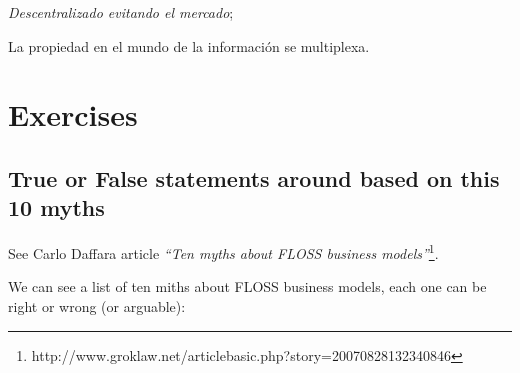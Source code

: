 \documentclass[11pt]{scrartcl}
\begin{document}
\emph{Descentralizado evitando el mercado};

La propiedad en el mundo de la información se multiplexa.

\section{Exercises}

\subsection{True or False statements around  based on this 10 myths}

See Carlo Daffara article \emph{“Ten myths about FLOSS business models”}\footnote{http://www.groklaw.net/articlebasic.php?story=20070828132340846}.

We can see a list of ten miths about FLOSS business models, each one can be right or wrong (or arguable):
\end{document}
